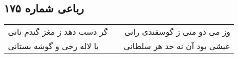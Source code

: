 \begin{center}
\section*{رباعی شماره ۱۷۵}
\label{sec:sh175}
\begin{longtable}{l p{0.5cm} r}
گر دست دهد ز مغز گندم نانی
&&
وز می دو منی ز گوسفندی رانی
\\
با لاله رخی و گوشه بستانی
&&
عیشی بود آن نه حد هر سلطانی
\\
\end{longtable}
\end{center}
